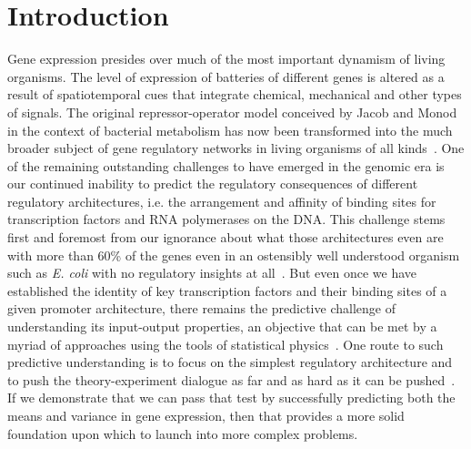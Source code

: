 \section{Introduction}

Gene expression presides over much of the most important dynamism of living
organisms. The level of expression of batteries of different genes is altered as
a result of spatiotemporal cues that integrate chemical, mechanical and other
types of signals. The original repressor-operator model conceived by Jacob and
Monod in the context of bacterial metabolism has now been transformed into the
much broader subject of gene regulatory networks in living organisms of all
kinds~\cite{Jacob1961, Britten1969, Ben-TabouDe-Leon2007}. One of the remaining
outstanding challenges to have emerged in the genomic era is our continued
inability to predict the regulatory consequences of different regulatory
architectures, i.e. the arrangement and affinity of binding sites for
transcription factors and RNA polymerases on the DNA. This challenge stems first
and foremost from our ignorance about what those architectures even are with
more than 60\% of the genes even in an ostensibly well understood organism such
as {\it E. coli} with no regulatory insights at all~\cite{Rydenfelt2014-2,
Belliveau2018, Ghatak2019, Santos_Zavaleta2019}. But even once we have
established the identity of key transcription factors and their binding sites of
a given promoter architecture, there remains the predictive challenge of
understanding its input-output properties, an objective that can be met by a
myriad of approaches using the tools of statistical physics~\cite{Ackers1982,
Shea1985, Buchler2003, Vilar2003a, Vilar2003b, Bintu2005a, Bintu2005c,
Gertz2009, Sherman2012, Saiz2013, Ko1991, Peccoud1995, Record1996, Kepler2001,
Sanchez2008, Shahrezaei2008, Sanchez2011, Michel2010}. One route to such
predictive understanding is to focus on the simplest regulatory architecture and
to push the theory-experiment dialogue as far and as hard as it can be
pushed~\cite{Garcia2011, Phillips2019}. If we demonstrate that we can pass that
test by successfully predicting both the means and variance in gene expression,
then that provides a more solid foundation upon which to launch into more
complex problems.

